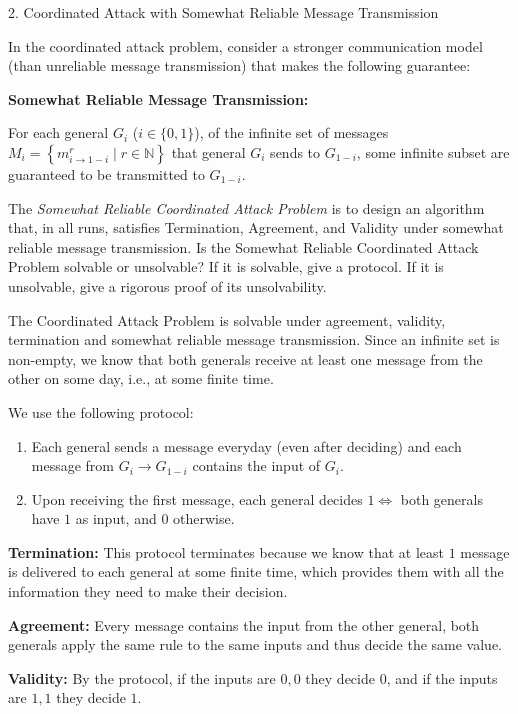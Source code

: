 \documentclass[12pt]{article}
\begin{document}
\newpage

\begin{problem}{2. Coordinated Attack with Somewhat Reliable Message Transmission}

    In the coordinated attack problem, consider a stronger communication model (than unreliable message transmission) that makes the following guarantee:
    \begin{tcolorbox}
        \textbf{Somewhat Reliable Message Transmission:} 
        
        For each general $G_i$ ($i \in \{0, 1\}$), of the infinite set of messages $M_i = \left\{ m^r_{i \to 1-i} \mid r \in \mathbb{N} \right\}$ that general $G_i$ sends to $G_{1-i}$, some infinite subset are guaranteed to be transmitted to $G_{1-i}$.
    \end{tcolorbox}
    The \emph{Somewhat Reliable Coordinated Attack Problem} is to design an algorithm that, in all runs, satisfies Termination, Agreement, and Validity under somewhat reliable message transmission.
    Is the Somewhat Reliable Coordinated Attack Problem solvable or unsolvable? If it is solvable, give a protocol. If it is unsolvable, give a rigorous proof of its unsolvability.
\end{problem}

\begin{solution}
    \bbni
    
    The Coordinated Attack Problem is solvable under agreement, validity, termination and somewhat reliable message transmission. Since an infinite set is non-empty, we know that both generals receive at least one message from the other on some day, i.e., at some finite time.   
    
    We use the following protocol: 
    \begin{enumerate}
        \item Each general sends a message everyday (even after deciding) and each message from $G_i \to G_{1-i}$ contains the input of $G_i$. 
        \item Upon receiving the first message, each general decides $1 \iff$ both generals have $1$ as input, and $0$ otherwise.
    \end{enumerate}

    \textbf{Termination:} This protocol terminates because we know that at least $1$ message is delivered to each general at some finite time, which provides them with all the information they need to make their decision. 

    \textbf{Agreement:} Every message contains the input from the other general, both generals apply the same rule to the same inputs and thus decide the same value. 

    \textbf{Validity:} By the protocol, if the inputs are $0,0$ they decide $0$, and if the inputs are $1,1$ they decide $1$. 

\end{solution}
\end{document}

